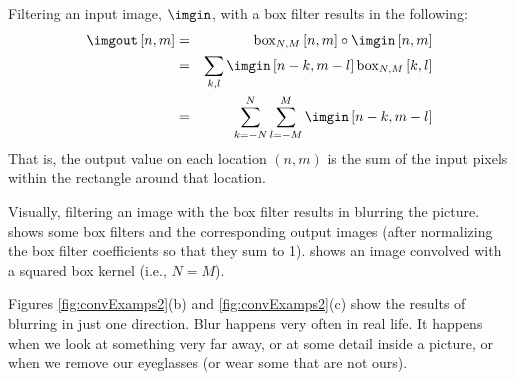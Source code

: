 
Filtering an input image, $\imgin$, with a box filter results in the following:
\begin{eqnarray}
\imgout \left[n,m\right] &=& \text{box}_{N,M} \left[n,m\right] \circ \imgin \left[n,m\right] \nonumber \\
&=&  \sum_{k,l} \imgin \left[n-k,m-l \right] \text{box}_{N,M} \left[k,l \right] \nonumber \\
&=&  \sum_{k=-N}^N \sum_{l=-M}^M \imgin \left[n-k,m-l \right]
\end{eqnarray}
That is, the output value on each location $(n,m)$ is the sum of the input pixels within the rectangle around that location.  


Visually, filtering an image with the box filter results in blurring the picture. \Fig{\ref{fig:convExamps2}} shows some box filters and the corresponding output images (after normalizing the box filter coefficients so that they sum to 1).  shows an image convolved with a squared box kernel (i.e., $N=M$). 

Figures \ref{fig:convExamps2}(b) and \ref{fig:convExamps2}(c)  show the results of blurring in just one direction. Blur happens very often in real life. It happens when we look at something very far away, or at some detail inside a picture, or when we remove our eyeglasses (or wear some that are not ours). 


